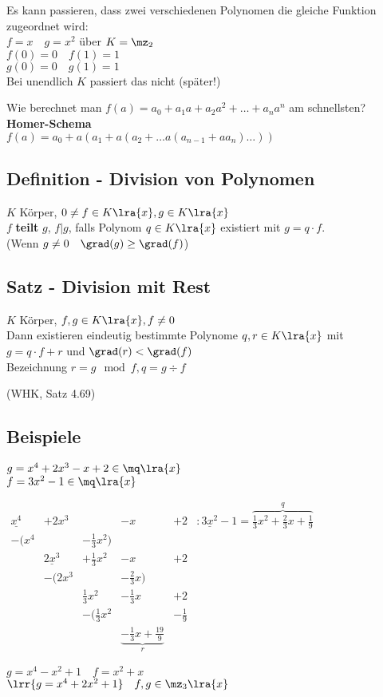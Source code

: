 			Es kann passieren, dass zwei verschiedenen Polynomen die gleiche Funktion zugeordnet wird:\\
			$f=x\quad g=x^2$ über $K=\mz_2$\\
			$f(0)=0\quad f(1)=1$\\
			$g(0)=0\quad g(1)=1$\\
			Bei unendlich $K$ passiert das nicht (später!)
		\item Wie berechnet man $f(a)=a_0+a_1a+a_2a^2+\dots +a_na^n$ am schnellsten?\\
			\textbf{Homer-Schema}\\
			$f(a) = a_0+a(a_1+a(a_2+\dots a(a_{n-1}+aa_n)\dots))$
	\subExEnd
\subsection{Definition - Division von Polynomen}
	$K$ Körper, $0\neq f\in K\lra{x}, g\in K\lra{x}$\\
	$f$ \textbf{teilt} $g$, $f|g$, falls Polynom $q\in K\lra{x}$ existiert mit $g=q\cdot f$.\\
	(Wenn $g\neq 0\quad \grad(g)\geq\grad(f)$)
\subsection{Satz - Division mit Rest}
	$K$ Körper, $f,g\in K\lra{x}, f\neq 0$\\
	Dann existieren eindeutig bestimmte Polynome $q,r\in K\lra{x}$ mit\\
	$g=q\cdot f+r$ und $\grad(r) <\grad(f)$\\
	Bezeichnung $r=g\mod f, q=g\div f$
	\begin{flushright}
		(WHK, Satz 4.69)
	\end{flushright}
\subsection{Beispiele}
		\item $g=x^4+2x^3-x+2\in\mq\lra{x}$\\
			$f=3x^2-1\in\mq\lra{x}$
			
			$\begin{array}{rrrrrl}
				\underline{x^4}	&+2x^3				&						&-x				&+2			&: \underline{3x^2}-1=\overbrace{\frac{1}{3}x^2+\frac{2}{3}x+\frac{1}{9}}^{q}\\
				-(x^4			&					&-\frac{1}{3}x^2)		&				&&\\
								&\underline{2x^3}	&+\frac{1}{3}x^2			&-x			&+2&\\
								&-(2x^3				&						&-\frac{2}{3}x)	&&\\
								&					&\frac{1}{3}x^2			&-\frac{1}{3}x	&+2	&\\
								&					&-(\frac{1}{3}x^2		&				&-\frac{1}{9}	&\\
								&					&						&\underbrace{-\frac{1}{3}x+\frac{19}{9}}_r&
			\end{array}$	
		\item $g=x^4-x^2+1\quad f=x^2+x$\\
			$\lrr{g=x^4+2x^2+1}\quad f,g\in \mz_3\lra{x}$
			
